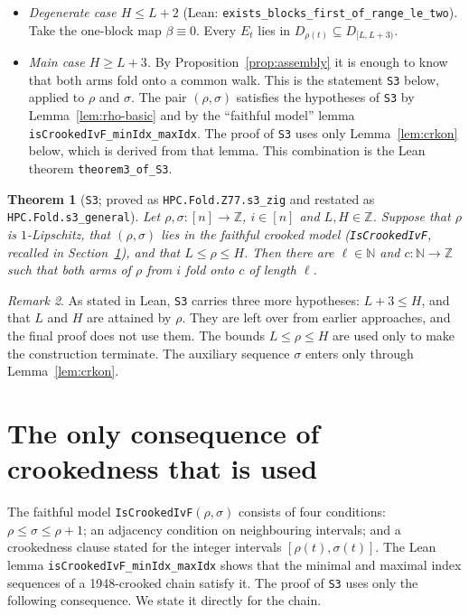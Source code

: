 \documentclass[11pt]{article}
\newtheorem{theorem}{Theorem}[section]
\theoremstyle{definition}
\theoremstyle{remark}
\newtheorem{remark}[theorem]{Remark}
\newcommand{\Z}{\mathbb{Z}}
\newcommand{\N}{\mathbb{N}}
\newcommand{\lean}[1]{\texttt{#1}}
\begin{document}
\begin{itemize}
\item \emph{Degenerate case $H\le L+2$} (Lean:
\lean{exists\_blocks\_first\_of\_range\_le\_two}). Take the one-block map
$\beta\equiv0$. Every $E_t$ lies in $D_{\rho(t)}\subseteq D_{[L,L+3)}$.
\item \emph{Main case $H\ge L+3$.} By Proposition~\ref{prop:assembly} it is
enough to know that both arms fold onto a common walk. This is the statement
\lean{S3} below, applied to $\rho$ and $\sigma$. The pair $(\rho,\sigma)$
satisfies the hypotheses of \lean{S3} by Lemma~\ref{lem:rho-basic} and by the
``faithful model'' lemma \lean{isCrookedIvF\_minIdx\_maxIdx}. The proof of
\lean{S3} uses only Lemma~\ref{lem:crkon} below, which is derived from that
lemma. This combination is the Lean theorem \lean{theorem3\_of\_S3}.
\end{itemize}

\begin{theorem}[\lean{S3}; proved as \lean{HPC.Fold.Z77.s3\_zig} and
restated as \lean{HPC.Fold.s3\_general}]\label{thm:S3}
Let $\rho,\sigma:[n]\to\Z$, $i\in[n]$ and $L,H\in\Z$. Suppose that $\rho$ is
$1$-Lipschitz, that $(\rho,\sigma)$ lies in the faithful crooked model
(\lean{IsCrookedIvF}, recalled in Section~\ref{sec:levels}), and that
$L\le\rho\le H$. Then there are $\ell\in\N$ and $c:\N\to\Z$ such that both arms
of $\rho$ from $i$ fold onto $c$ of length $\ell$.
\end{theorem}

\begin{remark}\label{rem:unused}
As stated in Lean, \lean{S3} carries three more hypotheses: $L+3\le H$, and
that $L$ and $H$ are attained by $\rho$. They are left over from earlier
approaches, and the final proof does not use them. The bounds $L\le\rho\le H$
are used only to make the construction terminate. The auxiliary sequence
$\sigma$ enters only through Lemma~\ref{lem:crkon}.
\end{remark}

\section{The only consequence of crookedness that is used}\label{sec:levels}

The faithful model \lean{IsCrookedIvF}$(\rho,\sigma)$ consists of four
conditions: $\rho\le\sigma\le\rho+1$; an adjacency condition on neighbouring
intervals; and a crookedness clause stated for the integer intervals
$[\rho(t),\sigma(t)]$. The Lean lemma \lean{isCrookedIvF\_minIdx\_maxIdx} shows
that the minimal and maximal index sequences of a 1948-crooked chain satisfy
it. The proof of \lean{S3} uses only the following consequence. We state it
directly for the chain.
\end{document}
